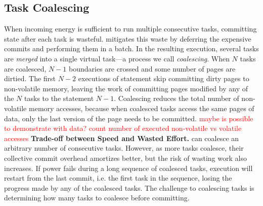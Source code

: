 \subsection{Task Coalescing}
\label{sec:task_coalescing}


When incoming energy is sufficient to run multiple consecutive tasks,
committing state after each task is wasteful. \sys mitigates this
waste by deferring the expensive commits and performing them in a
batch. In the resulting execution, several tasks are \emph{merged} into a
single virtual task---a process we call \emph{coalescing}. 
%
When $N$ tasks are coalesced, $N-1$ boundaries are crossed and some number of
pages are dirtied. The first $N-2$ executions of \transition statement skip
committing dirty pages to non-volatile memory, leaving the work of committing
pages modified by any of the $N$ tasks to the statement $N-1$.
Coalescing reduces the total number of non-volatile memory
accesses, because when coalesced tasks access the same pages of data, only the
last version of the page needs to be committed.  
\textcolor{red}{maybe is possible to demonstrate with data? count number of executed non-volatile vs volatile accesses}
%
\textbf{Trade-off between Speed and Wasted Effort.} \sys can coalesce an
arbitrary number of consecutive tasks. However, as more tasks coalesce, their
collective commit overhead amortizes better, but the risk of wasting work also
increases. If power fails during a long sequence of coalesced tasks, execution
will restart from the last commit, i.e. the first task in the sequence, losing
the progress made by any of the coalesced tasks.  The challenge to coalescing
tasks is determining how many tasks to coalesce before committing.
%

